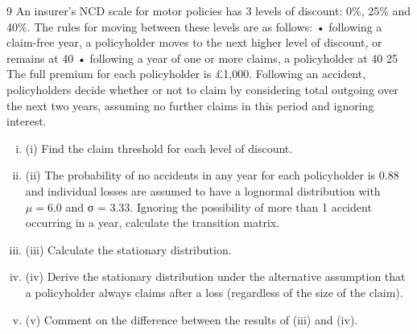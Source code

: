 \documentclass[a4paper,12pt]{article}
\begin{document}
\begin{enumerate}

9
An insurer’s NCD scale for motor policies has 3 levels of discount: 0\%, 25\% and 40\%. The rules for moving between these levels are as follows:
• following a claim-free year, a policyholder moves to the next higher level of
discount, or remains at 40%
• following a year of one or more claims, a policyholder at 40%
25%
The full premium for each policyholder is £1,000. Following an accident,
policyholders decide whether or not to claim by considering total outgoing over the next two years, assuming no further claims in this period and ignoring interest.
\begin{enumerate}[(i)]
\item (i) Find the claim threshold for each level of discount.
\item (ii) The probability of no accidents in any year for each policyholder is 0.88 and
individual losses are assumed to have a lognormal distribution with $\mu  = 6.0$
and σ = 3.33. Ignoring the possibility of more than 1 accident occurring in a year, calculate the transition matrix.
\item (iii) Calculate the stationary distribution.
\item (iv) Derive the stationary distribution under the alternative assumption that a policyholder always claims after a loss (regardless of the size of the claim). 
\item (v) Comment on the difference between the results of (iii) and (iv).
\end{enumerate}


\end{enumerate}
\end{document}
